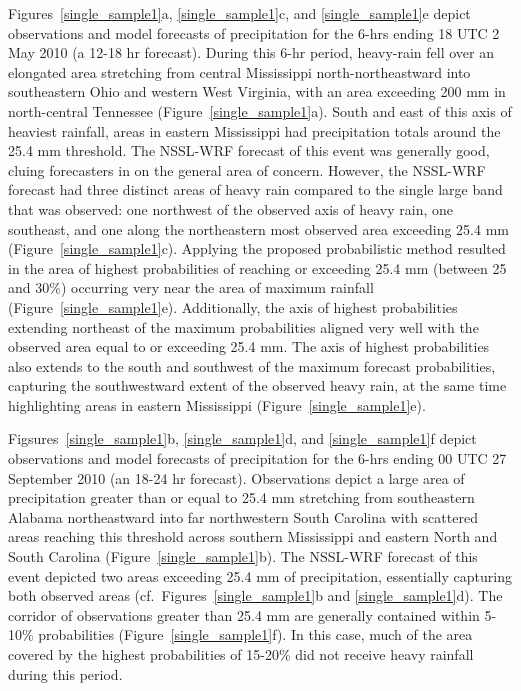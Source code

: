 \mbox{Figures \ref{single_sample1}a}, \mbox{\ref{single_sample1}c}, and \mbox{\ref{single_sample1}e} depict observations and model forecasts of precipitation for the 6-hrs ending 18 UTC 2 May 2010 (a 12-18 hr forecast). During this 6-hr period, heavy-rain fell over an elongated area stretching from central Mississippi north-northeastward into southeastern Ohio and western West Virginia, with an area exceeding 200 mm in north-central Tennessee \mbox{(Figure \ref{single_sample1}a)}. South and east of this axis of heaviest rainfall, areas in eastern Mississippi had precipitation totals around the 25.4 mm threshold. The NSSL-WRF forecast of this event was generally good, cluing forecasters in on the general area of concern. However, the NSSL-WRF forecast had three distinct areas of heavy rain compared to the single large band that was observed: one northwest of the observed axis of heavy rain, one southeast, and one along the northeastern most observed area exceeding 25.4 mm \mbox{(Figure \ref{single_sample1}c)}. Applying the proposed probabilistic method resulted in the area of highest probabilities of reaching or exceeding 25.4 mm (between 25 and 30\%) occurring very near the area of maximum rainfall \mbox{(Figure \ref{single_sample1}e)}. Additionally, the axis of highest probabilities extending northeast of the maximum probabilities aligned very well with the observed area equal to or exceeding 25.4 mm. The axis of highest probabilities also extends to the south and southwest of the maximum forecast probabilities, capturing the southwestward extent of the observed heavy rain, at the same time highlighting areas in eastern Mississippi \mbox{(Figure \ref{single_sample1}e)}.

\mbox{Figsures \ref{single_sample1}b}, \mbox{\ref{single_sample1}d}, and \mbox{\ref{single_sample1}f} depict observations and model forecasts of precipitation for the 6-hrs ending 00 UTC 27 September 2010 (an 18-24 hr forecast). Observations depict a large area of precipitation greater than or equal to 25.4 mm stretching from southeastern Alabama northeastward into far northwestern South Carolina with scattered areas reaching this threshold across southern Mississippi and eastern North and South Carolina \mbox{(Figure \ref{single_sample1}b)}. The NSSL-WRF forecast of this event depicted two areas exceeding 25.4 mm of precipitation, essentially capturing both observed areas (\mbox{cf. Figures \ref{single_sample1}b} and \mbox{\ref{single_sample1}d)}. The corridor of observations greater than 25.4 mm are generally contained within 5-10\% probabilities \mbox{(Figure \ref{single_sample1}f)}. In this case, much of the area covered by the highest probabilities of 15-20\% did not receive heavy rainfall during this period.

